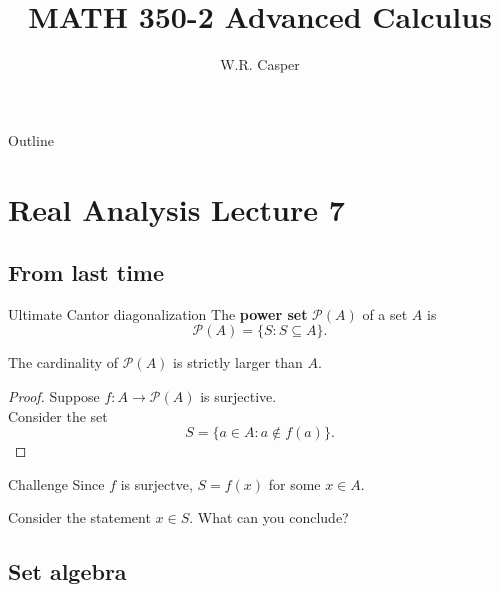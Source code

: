 \documentclass{beamer}
\title{MATH 350-2 Advanced Calculus}
\subtitle
{} %
\author[W.R. Casper] %
{W.R. Casper}
\institute[California State University Fullerton] %
{
  Department of Mathematics\\
  California State University Fullerton}
\begin{document}
\begin{frame}
  \titlepage
\end{frame}

\begin{frame}{Outline}
  \tableofcontents
\end{frame}



\section{Real Analysis Lecture 7}

\subsection{From last time}

\begin{frame}{Ultimate Cantor diagonalization}
The \textbf{power set}  $\mathcal{P}(A)$ of a set $A$ is
$$\mathcal P(A) = \{S: S\subseteq A\}.$$
\pause
\begin{thm}
The cardinality of $\mathcal P(A)$ is strictly larger than $A$.
\end{thm}
\pause
\begin{proof}
\pause
Suppose $f: A\rightarrow \mathcal P(A)$ is surjective.\\
\pause
Consider the set
$$S = \{a\in A: a\notin f(a)\}.$$
\end{proof}
\end{frame}

\begin{frame}{Challenge}
\pause
Since $f$ is surjectve, $S = f(x)$ for some $x\in A$.
\pause
\begin{prob}
Consider the statement $x\in S$.  What can you conclude?
\end{prob}
\end{frame}

\subsection{Set algebra}
\end{document}
